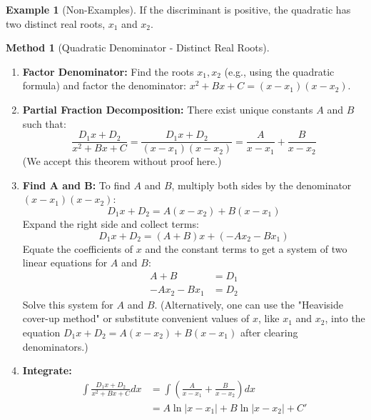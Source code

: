 \documentclass[11pt]{article}
\theoremstyle{plain}
\theoremstyle{definition}
\newtheorem{example}[theorem]{Example}
\newtheorem{method}[theorem]{Method}
\theoremstyle{remark}
\newcommand{\abs}[1]{\left|#1\right|}
\begin{document}
\begin{example}[Non-Examples]
If the discriminant is positive, the quadratic has two distinct real roots, $x_1$ and $x_2$.

\begin{method}[Quadratic Denominator - Distinct Real Roots]
\leavevmode
\begin{enumerate}
    \item \textbf{Factor Denominator:} Find the roots $x_1, x_2$ (e.g., using the quadratic formula) and factor the denominator: $x^2+Bx+C = (x-x_1)(x-x_2)$.
    \item \textbf{Partial Fraction Decomposition:} There exist unique constants $A$ and $B$ such that:
    \[ \frac{D_1 x + D_2}{x^2+Bx+C} = \frac{D_1 x + D_2}{(x-x_1)(x-x_2)} = \frac{A}{x-x_1} + \frac{B}{x-x_2} \]
    (We accept this theorem without proof here.)
    \item \textbf{Find A and B:} To find $A$ and $B$, multiply both sides by the denominator $(x-x_1)(x-x_2)$:
    \[ D_1 x + D_2 = A(x-x_2) + B(x-x_1) \]
    Expand the right side and collect terms:
    \[ D_1 x + D_2 = (A+B)x + (-Ax_2 - Bx_1) \]
    Equate the coefficients of $x$ and the constant terms to get a system of two linear equations for $A$ and $B$:
    \begin{align*} A + B &= D_1 \\ -Ax_2 - Bx_1 &= D_2 \end{align*}
    Solve this system for $A$ and $B$. (Alternatively, one can use the "Heaviside cover-up method" or substitute convenient values of $x$, like $x_1$ and $x_2$, into the equation $D_1 x + D_2 = A(x-x_2) + B(x-x_1)$ after clearing denominators.)
    \item \textbf{Integrate:}
    \begin{align*} \int \frac{D_1 x + D_2}{x^2+Bx+C} dx &= \int \left( \frac{A}{x-x_1} + \frac{B}{x-x_2} \right) dx \\ &= A \ln\abs{x-x_1} + B \ln\abs{x-x_2} + C' \end{align*}
\end{enumerate}
\end{method}


\end{example}
\end{document}
